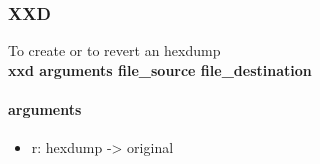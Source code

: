 \documentclass{article}
\begin{document}
                \subsubsection{XXD}
                    To create or to revert an hexdump\\
                    \textbf{xxd arguments file_source file_destination}
                    \paragraph{arguments}
                    \begin{itemize}
                        \item r: hexdump -> original
                    \end{itemize}
                    
                       
\end{document}
